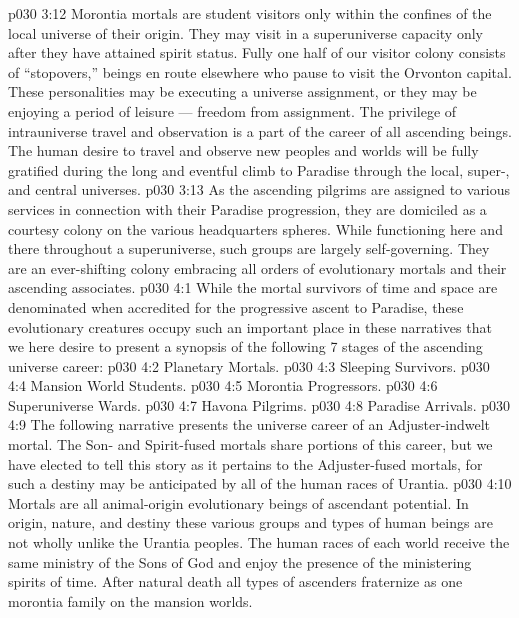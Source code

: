 \vs p030 3:12 Morontia mortals are student visitors only within the confines of the local universe of their origin. They may visit in a superuniverse capacity only after they have attained spirit status. Fully one half of our visitor colony consists of “stopovers,” beings en route elsewhere who pause to visit the Orvonton capital. These personalities may be executing a universe assignment, or they may be enjoying a period of leisure --- freedom from assignment. The privilege of intrauniverse travel and observation is a part of the career of all ascending beings. The human desire to travel and observe new peoples and worlds will be fully gratified during the long and eventful climb to Paradise through the local, super-, and central universes.
\vs p030 3:13 \bibnobreakspace {} As the ascending pilgrims are assigned to various services in connection with their Paradise progression, they are domiciled as a courtesy colony on the various headquarters spheres. While functioning here and there throughout a superuniverse, such groups are largely self\hyp{}governing. They are an ever\hyp{}shifting colony embracing all orders of evolutionary mortals and their ascending associates.
\vs p030 4:1 While the mortal survivors of time and space are denominated  when accredited for the progressive ascent to Paradise, these evolutionary creatures occupy such an important place in these narratives that we here desire to present a synopsis of the following 7 stages of the ascending universe career:
\vs p030 4:2 \bibnobreakspace Planetary Mortals.
\vs p030 4:3 \bibnobreakspace Sleeping Survivors.
\vs p030 4:4 \bibnobreakspace Mansion World Students.
\vs p030 4:5 \bibnobreakspace Morontia Progressors.
\vs p030 4:6 \bibnobreakspace Superuniverse Wards.
\vs p030 4:7 \bibnobreakspace Havona Pilgrims.
\vs p030 4:8 \bibnobreakspace Paradise Arrivals.
\vs p030 4:9 \pc The following narrative presents the universe career of an Adjuster\hyp{}indwelt mortal. The Son\hyp{} and Spirit\hyp{}fused mortals share portions of this career, but we have elected to tell this story as it pertains to the Adjuster\hyp{}fused mortals, for such a destiny may be anticipated by all of the human races of Urantia.
\vs p030 4:10 \bibnobreakspace {} Mortals are all animal\hyp{}origin evolutionary beings of ascendant potential. In origin, nature, and destiny these various groups and types of human beings are not wholly unlike the Urantia peoples. The human races of each world receive the same ministry of the Sons of God and enjoy the presence of the ministering spirits of time. After natural death all types of ascenders fraternize as one morontia family on the mansion worlds.
